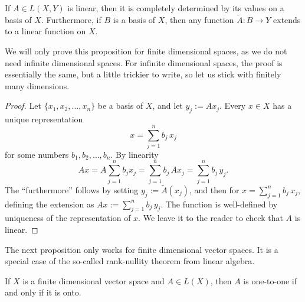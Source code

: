 \begin{prop} \label{mv:lindefonbasis}
If $A \in L(X,Y)$ is linear, then it is completely determined
by its values on a basis of $X$.
Furthermore, if $B$ is a basis of $X$,
then any function $\widetilde{A} \colon B \to Y$ extends to a linear
function on $X$.
\end{prop}

We will only prove this proposition for finite dimensional spaces, as we do
not need infinite dimensional spaces.
For infinite dimensional spaces, the proof is essentially the same, but a
little trickier to write, so let us stick with finitely many dimensions.

\begin{proof}
Let $\{ x_1, x_2, \ldots, x_n \}$ be a basis of $X$, and let 
$y_j := A x_j$.  Every $x \in X$ has a unique representation
\begin{equation*}
x = \sum_{j=1}^n b_j \, x_j
\end{equation*}
for some numbers $b_1,b_2,\ldots,b_n$.  By linearity
\begin{equation*}
Ax = 
A\sum_{j=1}^n b_j x_j
=
\sum_{j=1}^n b_j \, Ax_j
=
\sum_{j=1}^n b_j \, y_j .
\end{equation*}
The ``furthermore'' follows by setting $y_j := \widetilde{A}(x_j)$,
and then for 
$x = \sum_{j=1}^n b_j \, x_j$,
defining the extension as
$Ax := \sum_{j=1}^n b_j \, y_j$.  The function is well-defined by
uniqueness of the representation of $x$.
We leave it to the reader to check that $A$ is linear.
\end{proof}

The next proposition only works for finite dimensional vector spaces.
It is a special case of the so-called rank-nullity theorem from linear
algebra.

\begin{prop} \label{mv:prop:lin11onto}
If $X$ is a finite dimensional vector space and $A \in L(X)$, then $A$ is one-to-one if and only if it is onto.
\end{prop}


